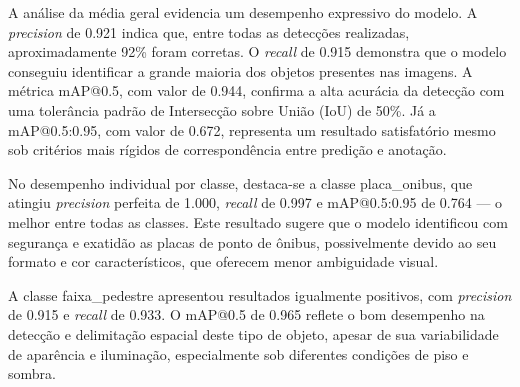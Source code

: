 \begin{table}[htbp]
\centering
\caption{Métricas de desempenho do modelo \texttt{yolo11m.pt} (best.pt) no conjunto de validação}
\label{tab:metricas-yolov11m}
\end{table}

A análise da média geral evidencia um desempenho expressivo do modelo. A \textit{precision} de 0.921 indica que, entre todas as detecções realizadas, aproximadamente 92\% foram corretas. O \textit{recall} de 0.915 demonstra que o modelo conseguiu identificar a grande maioria dos objetos presentes nas imagens. A métrica mAP@0.5, com valor de 0.944, confirma a alta acurácia da detecção com uma tolerância padrão de Intersecção sobre União (IoU) de 50\%. Já a mAP@0.5:0.95, com valor de 0.672, representa um resultado satisfatório mesmo sob critérios mais rígidos de correspondência entre predição e anotação.

No desempenho individual por classe, destaca-se a classe placa\_onibus, que atingiu \textit{precision} perfeita de 1.000, \textit{recall} de 0.997 e mAP@0.5:0.95 de 0.764 — o melhor entre todas as classes. Este resultado sugere que o modelo identificou com segurança e exatidão as placas de ponto de ônibus, possivelmente devido ao seu formato e cor característicos, que oferecem menor ambiguidade visual.

A classe faixa\_pedestre apresentou resultados igualmente positivos, com \textit{precision} de 0.915 e \textit{recall} de 0.933. O mAP@0.5 de 0.965 reflete o bom desempenho na detecção e delimitação espacial deste tipo de objeto, apesar de sua variabilidade de aparência e iluminação, especialmente sob diferentes condições de piso e sombra.

